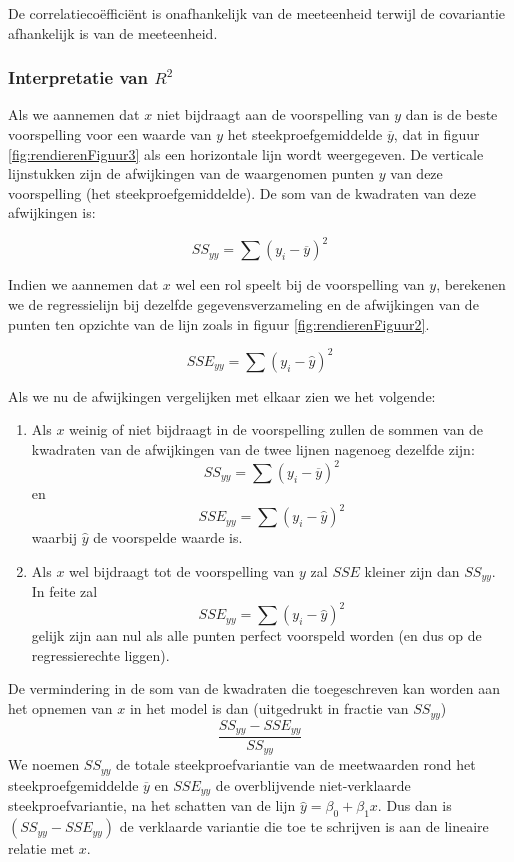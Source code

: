 De correlatieco\"effici\"ent is onafhankelijk van de meeteenheid terwijl de covariantie afhankelijk is van de meeteenheid.

\subsubsection{Interpretatie van $R^{2}$}

Als we aannemen dat $x$ niet bijdraagt aan de voorspelling van $y$ dan is de beste voorspelling voor een waarde van $y$ het steekproefgemiddelde $\overline{y}$, dat in figuur \ref{fig:rendierenFiguur3} als een horizontale lijn wordt weergegeven. De verticale lijnstukken zijn de afwijkingen van de waargenomen punten $y$ van deze voorspelling (het steekproefgemiddelde). De som van de kwadraten van deze afwijkingen is:

\[ SS_{yy} = \sum(y_{i} - \overline{y})^{2} \]

Indien we aannemen dat $x$ wel een rol speelt bij de voorspelling van $y$, berekenen we de regressielijn bij dezelfde gegevensverzameling en de afwijkingen van de punten ten opzichte van de lijn zoals in figuur \ref{fig:rendierenFiguur2}.

\[ SSE_{yy} = \sum(y_{i} - \widehat{y})^{2} \]

 Als we nu de afwijkingen vergelijken met elkaar zien we het volgende:
\begin{enumerate}
  \item Als $x$ weinig of niet bijdraagt in de voorspelling zullen de sommen van de kwadraten van de afwijkingen van de twee lijnen nagenoeg dezelfde zijn:
    \[ SS_{yy} = \sum(y_{i} - \overline{y})^{2} \] en
    \[ SSE_{yy} = \sum(y_{i} - \widehat{y})^{2} \]
    waarbij $\widehat{y}$ de voorspelde waarde is.
  \item Als $x$ wel bijdraagt tot de voorspelling van $y$ zal $SSE$ kleiner zijn dan $SS_{yy}$. In feite zal
    \[	SSE_{yy} = \sum(y_{i} - \widehat{y})^{2} \]
    gelijk zijn aan nul als alle punten perfect voorspeld worden (en dus op de regressierechte liggen).
\end{enumerate}

De vermindering in de som van de kwadraten die toegeschreven kan worden aan het opnemen van $x$ in het model is dan (uitgedrukt in fractie van $SS_{yy}$)
\[ \frac{SS_{yy} - SSE_{yy}}{SS_{yy}} \]
We noemen $SS_{yy}$ de totale steekproefvariantie van de meetwaarden rond het steekproefgemiddelde $\overline{y}$ en $SSE_{yy}$ de overblijvende niet-verklaarde steekproefvariantie, na het schatten van de lijn $\widehat{y} = \beta_{0} + \beta_{1}x$. Dus dan is $(SS_{yy} - SSE_{yy})$ de verklaarde variantie die toe te schrijven is aan de lineaire relatie met $x$.

